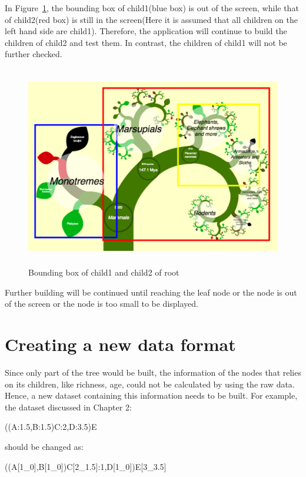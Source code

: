 \documentclass[MSc]{icldt}
\begin{document}
In Figure~\ref{fig:screenAndBounding2}, the bounding box of child1(blue box) is out of the screen, while that of child2(red box) is still in the screen(Here it is assumed that all children on the left hand side are child1). Therefore, the application will continue to build the children of child2 and test them. In contrast, the children of child1 will not be further checked. 

\begin{figure}[H]
  \centering
  \includegraphics [width=15cm,height=8.8cm]{ScreenAndBounding2}
  \caption{Bounding box of child1 and child2 of root}
  \label{fig:screenAndBounding2}
\end{figure}

Further building will be continued until reaching the leaf node or the node is out of the screen or the node is too small to be displayed.



\section{Creating a new data format}

Since only part of the tree would be built, the information of the nodes that relies on its children, like richness, age, could not be calculated by using the raw data. Hence, a new dataset containing this information needs to be built. For example, the dataset discussed in Chapter 2: 

\begin{center}
	((A:1.5,B:1.5)C:2,D:3.5)E
\end{center}

should be changed as:

\begin{center}
	((A[1\_0],B[1\_0])C[2\_1.5]:1,D[1\_0])E[3\_3.5]
\end{center}
\end{document}
